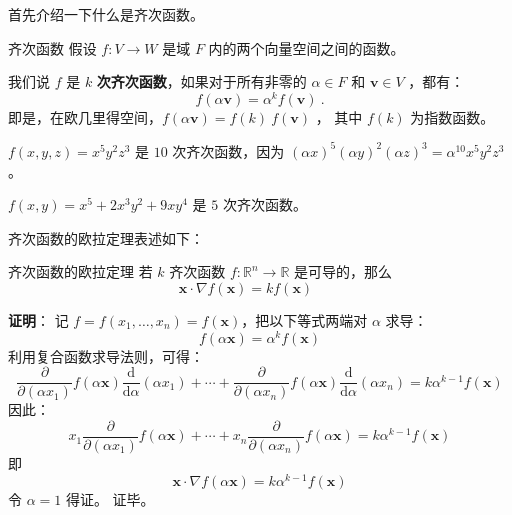 
\begin{issues}
\end{issues}



首先介绍一下什么是齐次函数。

\begin{definition}{齐次函数}
假设 $f: V \to W $ 是域 $ F $ 内的两个向量空间之间的函数。

我们说 $f$ 是 $k$ \textbf{次齐次函数}，如果对于所有非零的 $\alpha \in F$ 和 $\mathbf{v} \in V$ ，都有：
\begin{equation}
f(\alpha \mathbf{v}) = \alpha^k f(\mathbf{v}) ~.
\end{equation}
即是，在欧几里得空间，$f(\alpha \mathbf{v}) = f(k) \ f(\mathbf{v})$ ， 其中 $f(k)$ 为指数函数。
\end{definition}

\begin{example}{}
$f(x,y,z)=x^5y^2z^3$ 是 $10$ 次齐次函数，因为 $(\alpha x)^5(\alpha y)^2(\alpha z)^3=\alpha^{10}x^5y^2z^3$。

$f(x,y)=x^5 + 2 x^3 y^2 + 9 x y^4$ 是 $5$ 次齐次函数。
\end{example}

齐次函数的欧拉定理表述如下：

\begin{theorem}{齐次函数的欧拉定理}
若 $k$ 齐次函数 $ f:\mathbb{R}^n \to \mathbb{R}$ 是可导的，那么
\begin{equation}
{\displaystyle \mathbf {x} \cdot \nabla f(\mathbf {x} )=kf(\mathbf {x} )\qquad }
\end{equation}
\end{theorem}
\textbf{证明}： 记 $f=f(x_{1},\ldots ,x_{n})=f(\mathbf {x} )$，把以下等式两端对 $\alpha$ 求导：
\begin{equation}
{\displaystyle f(\alpha \mathbf {x} )=\alpha ^{k}f(\mathbf {x} )}
\end{equation}
利用复合函数求导法则，可得：
\begin{equation}
{\frac {\partial }{\partial (\alpha x_{1})}}f(\alpha \mathbf {x} ){\frac {\mathrm {d} }{\mathrm {d} \alpha }}(\alpha x_{1})+\cdots +{\frac {\partial }{\partial (\alpha x_{n})}}f(\alpha \mathbf {x} ){\frac {\mathrm {d} }{\mathrm {d} \alpha }}(\alpha x_{n})=k\alpha ^{k-1}f(\mathbf {x} )
\end{equation}
因此：
\begin{equation}
x_{1}{\frac {\partial }{\partial (\alpha x_{1})}}f(\alpha \mathbf {x} )+\cdots +x_{n}{\frac {\partial }{\partial (\alpha x_{n})}}f(\alpha \mathbf {x} )=k\alpha ^{k-1}f(\mathbf {x} )
\end{equation}
即
\begin{equation}
\mathbf {x} \cdot \nabla f(\alpha \mathbf {x} )=k\alpha ^{k-1}f(\mathbf {x} )
\end{equation}
令 $\alpha=1$ 得证。 证毕。

